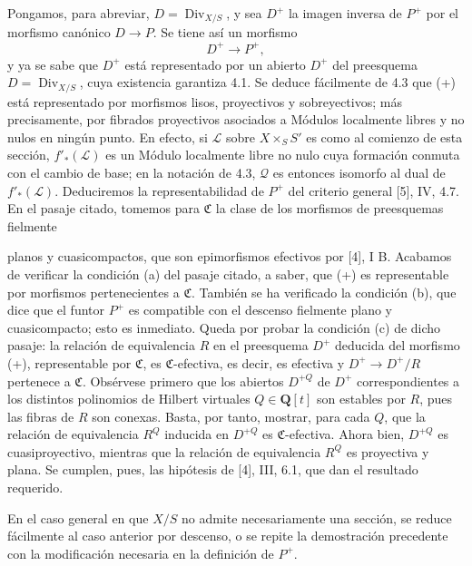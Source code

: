 \documentclass[11pt,twoside,openany]{book}
\numberwithin{equation}{section}
\newcommand{\src}[1]{%
  \phantomsection\hypertarget{src:#1}{}%
  \marginpar{\raggedleft\footnotesize\sffamily #1}%
}
\theoremstyle{plain}
\theoremstyle{definition}
\theoremstyle{remark}
\newcommand{\FgaUnitKey}{frontmatter}
\renewcommand{\src}[1]{%
  \phantomsection\hypertarget{src:\FgaUnitKey:#1}{}%
  \marginpar{\raggedleft\footnotesize\sffamily #1}%
}
\theoremstyle{plain}
\theoremstyle{definition}
\theoremstyle{remark}
\begin{document}
Pongamos, para abreviar, $D=\operatorname{Div}_{X/S}$, y sea $D^+$ la imagen
inversa de $P^+$ por el morfismo canónico $D\longrightarrow P$. Se tiene así un
morfismo
\begin{equation}
D^+\longrightarrow P^+,
\tag{+}
\end{equation}
y ya se sabe que $D^+$ está representado por un abierto $D^+$ del preesquema
$D=\operatorname{Div}_{X/S}$, cuya existencia garantiza 4.1. Se deduce
fácilmente de 4.3 que (+) está representado por morfismos lisos, proyectivos y
sobreyectivos; más precisamente, por fibrados proyectivos asociados a Módulos
localmente libres y no nulos en ningún punto. En efecto, si $\mathcal L$ sobre
$X\times_SS'$ es como al comienzo de esta sección, $f'_*(\mathcal L)$ es un
Módulo localmente libre no nulo cuya formación conmuta con el cambio de base;
en la notación de 4.3, $\mathcal Q$ es entonces isomorfo al dual de
$f'_*(\mathcal L)$. Deduciremos la representabilidad de $P^+$ del criterio
general [5], IV, 4.7. En el pasaje citado, tomemos para $\mathfrak C$ la clase
de los morfismos de preesquemas fielmente

\src{155}
planos y cuasicompactos, que son epimorfismos efectivos por [4], I B. Acabamos
de verificar la condición (a) del pasaje citado, a saber, que (+) es
representable por morfismos pertenecientes a $\mathfrak C$. También se ha
verificado la condición (b), que dice que el funtor $P^+$ es compatible con el
descenso fielmente plano y cuasicompacto; esto es inmediato. Queda por probar
la condición (c) de dicho pasaje: la relación de equivalencia $R$ en el
preesquema $D^+$ deducida del morfismo (+), representable por $\mathfrak C$, es
$\mathfrak C$-efectiva, es decir, es efectiva y
$D^+\longrightarrow D^+/R$ pertenece a $\mathfrak C$. Obsérvese primero que
los abiertos $D^{+Q}$ de $D^+$ correspondientes a los distintos polinomios de
Hilbert virtuales $Q\in\mathbf Q[t]$ son estables por $R$, pues las fibras de
$R$ son conexas. Basta, por tanto, mostrar, para cada $Q$, que la relación de
equivalencia $R^Q$ inducida en $D^{+Q}$ es $\mathfrak C$-efectiva. Ahora bien,
$D^{+Q}$ es cuasiproyectivo, mientras que la relación de equivalencia $R^Q$ es
proyectiva y plana. Se cumplen, pues, las hipótesis de [4], III, 6.1, que dan el
resultado requerido.

En el caso general en que $X/S$ no admite necesariamente una sección, se reduce
fácilmente al caso anterior por descenso, o se repite la demostración precedente
con la modificación necesaria en la definición de $P^+$.
\end{document}
